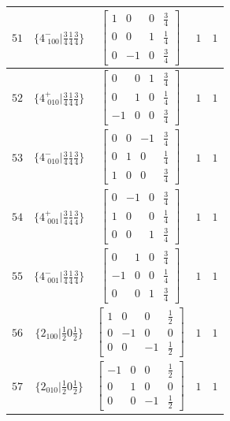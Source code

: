 \documentclass[fleqn,8pt]{jsarticle}
\begin{document}
\begin{longtable}{ccccc}
$ 51 $ & $ \{4^{-}_{\,\,100}|\frac{3}{4} \frac{1}{4} \frac{3}{4}\} $ & $ \begin{bmatrix} 1 & 0 & 0 & \frac{3}{4} \\ 0 & 0 & 1 & \frac{1}{4} \\ 0 & -1 & 0 & \frac{3}{4} \end{bmatrix} $ & $ 1 $ & $ 1 $ \\ \hline
$ 52 $ & $ \{4^{+}_{\,\,010}|\frac{3}{4} \frac{1}{4} \frac{3}{4}\} $ & $ \begin{bmatrix} 0 & 0 & 1 & \frac{3}{4} \\ 0 & 1 & 0 & \frac{1}{4} \\ -1 & 0 & 0 & \frac{3}{4} \end{bmatrix} $ & $ 1 $ & $ 1 $ \\ \hline
$ 53 $ & $ \{4^{-}_{\,\,010}|\frac{3}{4} \frac{1}{4} \frac{3}{4}\} $ & $ \begin{bmatrix} 0 & 0 & -1 & \frac{3}{4} \\ 0 & 1 & 0 & \frac{1}{4} \\ 1 & 0 & 0 & \frac{3}{4} \end{bmatrix} $ & $ 1 $ & $ 1 $ \\ \hline
$ 54 $ & $ \{4^{+}_{\,\,001}|\frac{3}{4} \frac{1}{4} \frac{3}{4}\} $ & $ \begin{bmatrix} 0 & -1 & 0 & \frac{3}{4} \\ 1 & 0 & 0 & \frac{1}{4} \\ 0 & 0 & 1 & \frac{3}{4} \end{bmatrix} $ & $ 1 $ & $ 1 $ \\ \hline
$ 55 $ & $ \{4^{-}_{\,\,001}|\frac{3}{4} \frac{1}{4} \frac{3}{4}\} $ & $ \begin{bmatrix} 0 & 1 & 0 & \frac{3}{4} \\ -1 & 0 & 0 & \frac{1}{4} \\ 0 & 0 & 1 & \frac{3}{4} \end{bmatrix} $ & $ 1 $ & $ 1 $ \\ \hline
$ 56 $ & $ \{2{}_{100}|\frac{1}{2} 0 \frac{1}{2}\} $ & $ \begin{bmatrix} 1 & 0 & 0 & \frac{1}{2} \\ 0 & -1 & 0 & 0 \\ 0 & 0 & -1 & \frac{1}{2} \end{bmatrix} $ & $ 1 $ & $ 1 $ \\ \hline
$ 57 $ & $ \{2{}_{010}|\frac{1}{2} 0 \frac{1}{2}\} $ & $ \begin{bmatrix} -1 & 0 & 0 & \frac{1}{2} \\ 0 & 1 & 0 & 0 \\ 0 & 0 & -1 & \frac{1}{2} \end{bmatrix} $ & $ 1 $ & $ 1 $ \\ \hline

\end{longtable}
\end{document}
